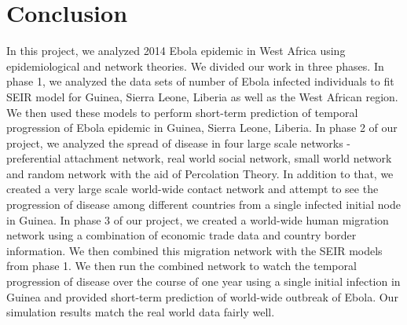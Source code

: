 \documentclass[10pt, journal,onecolumn]{IEEEtran}
\begin{document}
\section{Conclusion} In this project, we analyzed 2014 Ebola epidemic in West Africa using
epidemiological and network theories. We divided our work in three phases. In phase 1, we analyzed
the data sets of number of Ebola infected individuals to fit  SEIR model for Guinea, Sierra Leone,
Liberia as well as the West African region. We then used these models to perform short-term
prediction of temporal progression of Ebola epidemic in  Guinea, Sierra Leone, Liberia. In phase 2
of our project, we analyzed the spread of disease in four large scale networks - preferential
attachment network, real world social network, small world network and random network with the aid
of Percolation Theory. In addition to that, we created a very large scale world-wide contact network
and attempt to see the progression of disease among different countries from a single infected
initial node in Guinea. In phase 3 of our project, we created a world-wide human migration network
using a combination of economic trade data and country border information. We then combined this
migration network with the SEIR models from phase 1. We then run the combined network to watch the
temporal progression of disease over the course of one year using a single initial infection in
Guinea and provided short-term prediction of world-wide outbreak of Ebola. Our simulation results
match the real world data fairly well.








\end{document}
